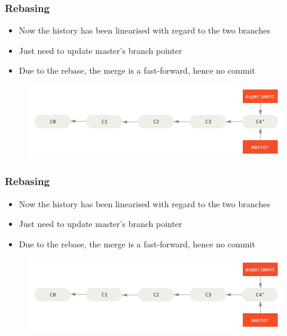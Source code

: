 \documentclass{beamer}
\begin{document}
\begin{frame}
	\frametitle{Rebasing}
	\begin{itemize}
		\item{Now the history has been linearised with regard to the two branches}
		\item{Just need to update master's branch pointer}
		\item{Due to the rebase, the merge is a fast-forward, hence no commit}
	\end{itemize}
	\begin{figure}
		\includegraphics[scale=0.4]{Rebasing-5.png}
	\end{figure}
\end{frame}

\begin{frame}
	\frametitle{Rebasing}
	\begin{itemize}
		\item{Now the history has been linearised with regard to the two branches}
		\item{Just need to update master's branch pointer}
		\item{Due to the rebase, the merge is a fast-forward, hence no commit}
	\end{itemize}
	\begin{figure}
		\includegraphics[scale=0.4]{Rebasing-5.png}
	\end{figure}
\end{frame}
\end{document}
